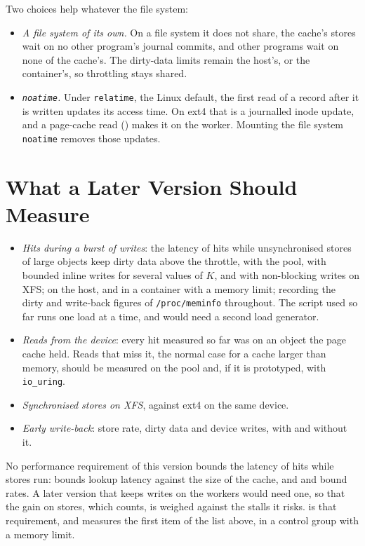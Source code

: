 Two choices help whatever the file system:
\begin{itemize}
  \item \emph{A file system of its own.} On a file system it does not
    share, the cache's stores wait on no other program's journal commits,
    and other programs wait on none of the cache's. The dirty-data limits
    remain the host's, or the container's, so throttling stays shared.
  \item \emph{\texttt{noatime}.} Under \texttt{relatime}, the Linux default,
    the first read of a record after it is written updates its access time.
    On ext4 that is a journalled inode update, and a page-cache read
    () makes it on the worker. Mounting the
    file system \texttt{noatime} removes those updates.
\end{itemize}

\section{What a Later Version Should Measure}
\label{app:executor-measure}

\begin{itemize}
  \item \emph{Hits during a burst of writes}: the latency of hits while
    unsynchronised stores of large objects keep dirty data above the
    throttle, with the pool, with bounded inline writes for several values
    of $K$, and with non-blocking writes on XFS; on the host, and in a
    container with a memory limit; recording the dirty and write-back
    figures of \texttt{/proc/meminfo} throughout. The script used so far
    runs one load at a time, and would need a second load generator.
  \item \emph{Reads from the device}: every hit measured so far was on an
    object the page cache held. Reads that miss it, the normal case for a
    cache larger than memory, should be measured on the pool and, if it is
    prototyped, with \texttt{io\_uring}.
  \item \emph{Synchronised stores on XFS}, against ext4 on the same device.
  \item \emph{Early write-back}: store rate, dirty data and device writes,
    with and without it.
\end{itemize}

No performance requirement of this version bounds the latency of hits while
stores run:  bounds lookup latency against
the size of the cache, and  and
 bound rates. A later version that keeps
writes on the workers would need one, so that the gain on stores, which
 counts, is weighed against the stalls it risks.
 is that requirement, and
 measures the first item of the list
above, in a control group with a memory limit.
